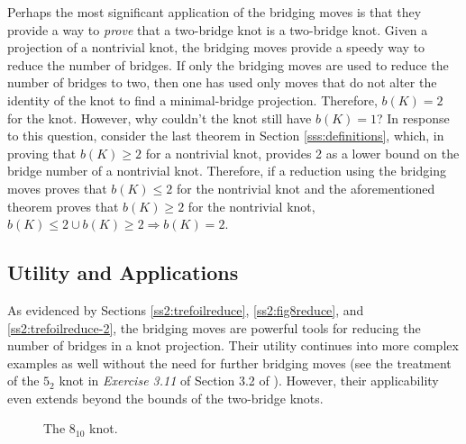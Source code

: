 \documentclass[titlepage,11pt]{article}
\begin{document}
Perhaps the most significant application of the bridging moves is that they provide a way to \emph{prove} that a two-bridge knot is a two-bridge knot. Given a projection of a nontrivial knot, the bridging moves provide a speedy way to reduce the number of bridges. If only the bridging moves are used to reduce the number of bridges to two, then one has used only moves that do not alter the identity of the knot to find a minimal-bridge projection. Therefore, $b(K)=2$ for the knot. However, why couldn't the knot still have $b(K)=1$? In response to this question, consider the last theorem in Section \ref{sss:definitions}, which, in proving that $b(K)\geq 2$ for a nontrivial knot, provides 2 as a lower bound on the bridge number of a nontrivial knot. Therefore, if a reduction using the bridging moves proves that $b(K)\leq 2$ for the nontrivial knot and the aforementioned theorem proves that $b(K)\geq 2$ for the nontrivial knot, $b(K)\leq 2 \cup b(K)\geq 2\Rightarrow b(K)=2$.


\subsection{Utility and Applications}\label{sss:utility}
As evidenced by Sections \ref{ss2:trefoilreduce}, \ref{ss2:fig8reduce}, and \ref{ss2:trefoilreduce-2}, the bridging moves are powerful tools for reducing the number of bridges in a knot projection. Their utility continues into more complex examples as well without the need for further bridging moves (see the treatment of the $5_2$ knot in \emph{Exercise 3.11} of Section 3.2 of \cite{bib:knotnotes}). However, their applicability even extends beyond the bounds of the two-bridge knots.\par

\begin{figure}[h!]
    \centering
    \vspace{-1.5em}
    \caption{The $8_{10}$ knot.}
    \label{fig:810}
\end{figure}
\end{document}
